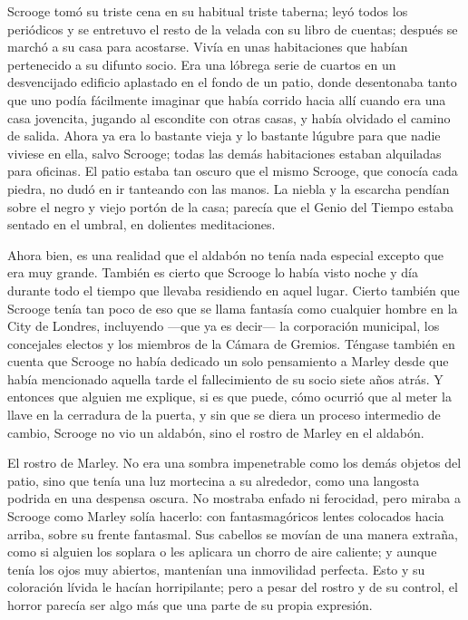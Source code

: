 \documentclass{novela}
\begin{document}
 Scrooge tomó su triste cena en su habitual triste taberna; leyó todos los periódicos y se entretuvo el resto de la velada con su libro de cuentas; después se marchó a su casa para acostarse. Vivía en unas habitaciones que habían pertenecido a su difunto socio. Era una lóbrega serie de cuartos en un desvencijado edificio aplastado en el fondo de un patio, donde desentonaba tanto que uno podía fácilmente imaginar que había corrido hacia allí cuando era una casa jovencita, jugando al escondite con otras casas, y había olvidado el camino de salida. Ahora ya era lo bastante vieja y lo bastante lúgubre para que nadie viviese en ella, salvo Scrooge; todas las demás habitaciones estaban alquiladas para oficinas. El patio estaba tan oscuro que el mismo Scrooge, que conocía cada piedra, no dudó en ir tanteando con las manos. La niebla y la escarcha pendían sobre el negro y viejo portón de la casa; parecía que el Genio del Tiempo estaba sentado en el umbral, en dolientes meditaciones.

 Ahora bien, es una realidad que el aldabón no tenía nada especial excepto que era muy grande. También es cierto que Scrooge lo había visto noche y día durante todo el tiempo que llevaba residiendo en aquel lugar. Cierto también que Scrooge tenía tan poco de eso que se llama fantasía como cualquier hombre en la City de Londres, incluyendo ---que ya es decir--- la corporación municipal, los concejales electos y los miembros de la Cámara de Gremios. Téngase también en cuenta que Scrooge no había dedicado un solo pensamiento a Marley desde que había mencionado aquella tarde el fallecimiento de su socio siete años atrás. Y entonces que alguien me explique, si es que puede, cómo ocurrió que al meter la llave en la cerradura de la puerta, y sin que se diera un proceso intermedio de cambio, Scrooge no vio un aldabón, sino el rostro de Marley en el aldabón.

 El rostro de Marley. No era una sombra impenetrable como los demás objetos del patio, sino que tenía una luz mortecina a su alrededor, como una langosta podrida en una despensa oscura. No mostraba enfado ni ferocidad, pero miraba a Scrooge como Marley solía hacerlo: con fantasmagóricos lentes colocados hacia arriba, sobre su frente fantasmal. Sus cabellos se movían de una manera extraña, como si alguien los soplara o les aplicara un chorro de aire caliente; y aunque tenía los ojos muy abiertos, mantenían una inmovilidad perfecta. Esto y su coloración lívida le hacían horripilante; pero a pesar del rostro y de su control, el horror parecía ser algo más que una parte de su propia expresión.
\end{document}
